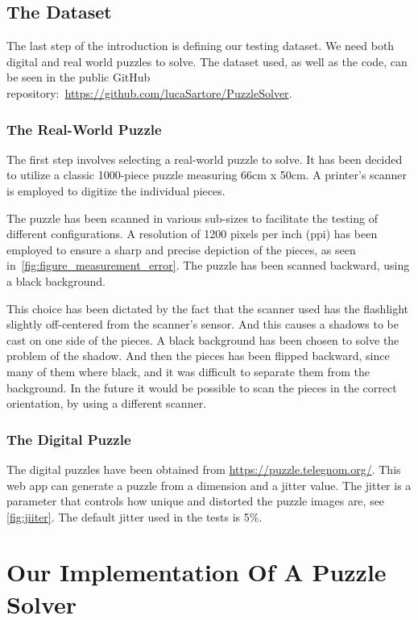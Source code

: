 \documentclass{article}
\begin{document}
\subsection{The Dataset}
The last step of the introduction is defining our
testing dataset. We need both digital and real world
puzzles to solve. The dataset used, as well as
the code, can be seen in the public GitHub
repository:~\url{https://github.com/lucaSartore/PuzzleSolver}.
\label{document:dataset}
\subsubsection{The Real-World Puzzle}
The first step involves selecting a real-world
puzzle to solve. It has been decided to utilize a
classic 1000-piece puzzle measuring 66cm x 50cm.
A printer's scanner is employed to digitize the individual pieces.

The puzzle has been scanned in various sub-sizes to facilitate the testing of different configurations.
A resolution of 1200 pixels per inch (ppi) has been employed to ensure a sharp and precise
depiction of the pieces, as seen in~\cref{fig:figure_measurement_error}.
The puzzle has been scanned backward, using a black background.

This choice has been dictated by the fact that the scanner used has the flashlight
slightly off-centered from the scanner's sensor.
And this causes a shadows to be cast on one side of the pieces.
A black background has been chosen to solve the problem of the shadow.
And then the pieces has been flipped backward, since many of them where black,
and it was difficult to separate them from the background.
In the future it would be possible to scan the pieces in the correct orientation,
by using a different scanner.

\subsubsection{The Digital Puzzle}
The digital puzzles have been obtained from \url{https://puzzle.telegnom.org/}.
This web app can generate a puzzle from a dimension and a jitter value. The jitter is a parameter that controls
how unique and distorted the puzzle images are, see \cref{fig:jiiter}.
The default jitter used in the tests is 5\%.

\section{Our Implementation Of A Puzzle Solver}
\end{document}
